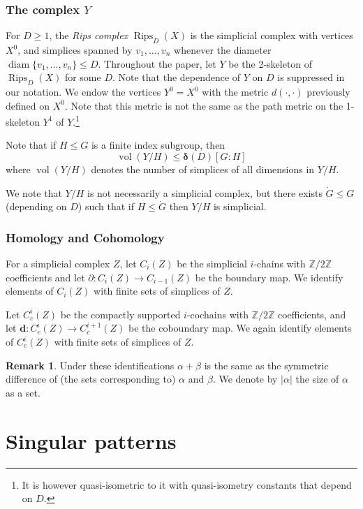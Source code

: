 \documentclass{amsart}
\numberwithin{equation}{section}
\theoremstyle{definition}
\newtheorem{remark}[theorem]{Remark}
\newcommand{\bbZ}{\mathbb{Z}}
\newcommand{\bfd}{\mathbf{d}}
\newcommand{\bdelta}{{\boldsymbol\delta}}
\DeclareMathOperator{\diam}{diam}
\DeclareMathOperator{\vol}{vol}
\DeclareMathOperator{\Rips}{Rips}
\begin{document}
\subsubsection*{The complex $Y$}

For $D\ge 1$, the \emph{Rips complex} $\Rips_D(X)$ is the simplicial complex with vertices $X^0$, and simplices spanned by $v_1,\dots,v_n$ whenever the diameter $\diam\{v_1,\dots ,v_n\}\le D$.
Throughout the paper, let $Y$ be the 2-skeleton of $\Rips_D(X)$ for some $D$.
Note that the dependence of $Y$ on $D$ is suppressed in our notation.
We endow the vertices $Y^0=X^0$ with the metric $d(\cdot,\cdot)$ previously defined on $X^0$. Note that this metric is not the same as the path metric on the 1-skeleton $Y^1$ of $Y$.\footnote{It is however quasi-isometric to it with quasi-isometry constants that depend on $D$.}

Note that if $H\le G$ is a finite index subgroup, then 
        \begin{equation}\label{eq: vol < index}
            \vol(Y/H)\le \bdelta(D) [G:H]
        \end{equation}
where $\vol(Y/H)$ denotes the number of simplices of all dimensions in $Y/H$.

We note that $Y/H$ is not necessarily a simplicial complex, but there exists $\dot G\le G$ (depending on $D$) such that if $H\le \dot G$ then $Y/H$ is simplicial. 

\subsubsection*{Homology and Cohomology}
For a simplicial complex $Z$, let $C_i(Z)$ be the simplicial $i$-chains with $\bbZ/2\bbZ$ coefficients and let $\partial:C_i(Z)\to C_{i-1}(Z)$ be the boundary map.
We identify elements of $C_i(Z)$ with finite sets of simplices of $Z$. 

Let $C^i_c(Z)$ be the compactly supported $i$-cochains with $\bbZ/2\bbZ$ coefficients, and let $\bfd:C^i_c(Z)\to C^{i+1}_c(Z)$ be the coboundary map.
We again identify elements of $C^i_c(Z)$ with finite sets of simplices of $Z$.

\begin{remark}
    Under these identifications $\alpha+\beta$ is the same as the symmetric difference of (the sets corresponding to) $\alpha$ and $\beta$.
We denote by $|\alpha|$ the size of $\alpha$ as a set.
\end{remark}


\section{Singular patterns}
\label{sec: singular patterns}
\end{document}

